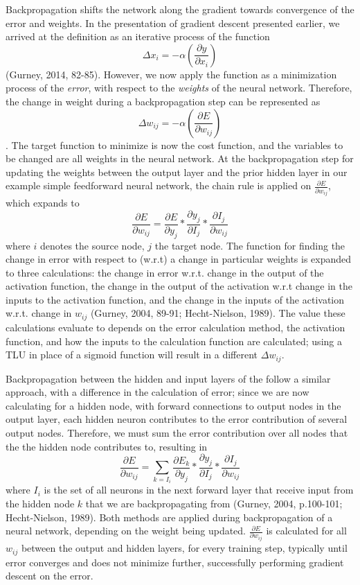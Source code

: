 \documentclass[11pt,titlepage]{article}
\begin{document}
Backpropagation shifts the network along the gradient towards convergence of the error and weights. In the presentation of gradient descent presented earlier, we arrived at the definition as an iterative process of the function $$\Delta x_i = -\alpha(\frac{\partial y}{\partial x_i})$$ (Gurney, 2014, 82-85). However, we now apply the function as a minimization process of the \textit{error}, with respect to the \textit{weights} of the neural network. Therefore, the change in weight during a backpropagation step can be represented as $$\Delta w_{ij}= -\alpha(\frac{\partial E}{\partial w_{ij}})$$. The target function to minimize is now the cost function, and the variables to be changed are all weights in the neural network. At the backpropagation step for updating the weights between the output layer and the prior hidden layer in our example simple feedforward neural network, the chain rule is applied on $\frac{\partial E}{\partial w_{ij}} $, which expands to $$\frac{\partial E}{\partial w_{ij}} = \frac{\partial E}{\partial y_j} * \frac{\partial y_j}{\partial I_{j}} * \frac{\partial I_{j}}{\partial w_{ij}}$$ where $i$ denotes the source node, $j$ the target node. The function for finding the change in error with respect to (w.r.t) a change in particular weights is expanded to three calculations: the change in error w.r.t. change in the output of the activation function, the change in the output of the activation w.r.t change in the inputs to the activation function, and the change in the inputs of the activation w.r.t. change in $w_{ij}$ (Gurney, 2004, 89-91; Hecht-Nielson, 1989). The value these calculations evaluate to depends on the error calculation method, the activation function, and how the inputs to the calculation function are calculated; using a TLU in place of a sigmoid function will result in a different $\Delta w_{ij}$.\par
Backpropagation between the hidden and input layers of the follow a similar approach, with a difference in the calculation of error; since we are now calculating for a hidden node, with forward connections to output nodes in the output layer, each hidden neuron contributes to the error contribution of several output nodes. Therefore, we must sum the error contribution over all nodes that the the hidden node contributes to, resulting in $$\frac{\partial E}{\partial w_{ij}} = \sum_{k=I_i}{\frac{\partial E_k}{\partial y_j}} * \frac{\partial y_j}{\partial I_{j}} * \frac{\partial I_{j}}{\partial w_{ij}}$$ where $I_i$ is the set of all neurons in the next forward layer that receive input from the hidden node $k$ that we are backpropagating from (Gurney, 2004, p.100-101; Hecht-Nielson, 1989). Both methods are applied during backpropagation of a neural network, depending on the weight being updated. $\frac{\partial E}{\partial w_{ij}}$ is calculated for all $w_{ij}$ between the output and hidden layers, for every training step, typically until error converges and does not minimize further, successfully performing gradient descent on the error.\par
\end{document}
